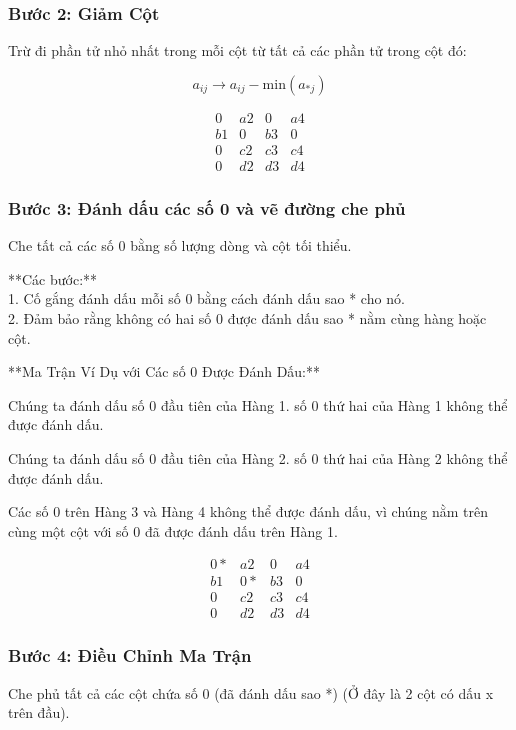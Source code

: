 \subsubsection*{Bước 2: Giảm Cột}

Trừ đi phần tử nhỏ nhất trong mỗi cột từ tất cả các phần tử trong cột đó:

\[
a_{ij} \rightarrow a_{ij} - \text{min}(a_{*j})
\]

\[
\begin{matrix}
0 & a2 & 0 & a4 \\
b1 & 0 & b3 & 0 \\
0 & c2 & c3 & c4 \\
0 & d2 & d3 & d4
\end{matrix}
\]

\subsubsection*{Bước 3: Đánh dấu các số 0 và vẽ đường che phủ}

Che tất cả các số 0 bằng số lượng dòng và cột tối thiểu. 

**Các bước:**\\
1. Cố gắng đánh dấu mỗi số 0 bằng cách đánh dấu sao * cho nó.\\
2. Đảm bảo rằng không có hai số 0 được đánh dấu sao * nằm cùng hàng hoặc cột.

**Ma Trận Ví Dụ với Các số 0 Được Đánh Dấu:**

Chúng ta đánh dấu số 0 đầu tiên của Hàng 1. số 0 thứ hai của Hàng 1 không thể được đánh dấu.

Chúng ta đánh dấu số 0 đầu tiên của Hàng 2. số 0 thứ hai của Hàng 2 không thể được đánh dấu.

Các số 0 trên Hàng 3 và Hàng 4 không thể được đánh dấu, vì chúng nằm trên cùng một cột với số 0 đã được đánh dấu trên Hàng 1.

\[
\begin{matrix}
0* & a2 & 0 & a4 \\
b1 & 0* & b3 & 0 \\
0 & c2 & c3 & c4 \\
0 & d2 & d3 & d4
\end{matrix}
\]

\subsubsection*{Bước 4: Điều Chỉnh Ma Trận}
Che phủ tất cả các cột chứa số 0 (đã đánh dấu sao *) (Ở đây là 2 cột có dấu x trên đầu).

